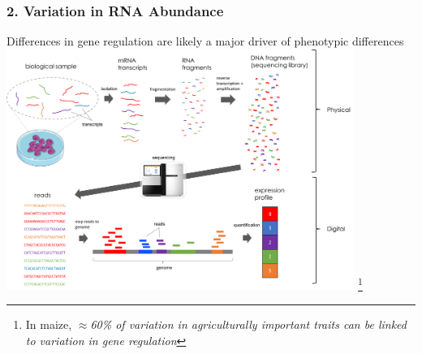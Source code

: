 \documentclass{beamer}
\newcommand\blfootnote[1]{%
	\begingroup
	\renewcommand\thefootnote{}\footnote{#1}%
	\addtocounter{footnote}{-1}%
	\endgroup
}
\begin{document}
	
\begin{frame}
		\frametitle{2. Variation in RNA Abundance}
\scriptsize
Differences in gene regulation are likely a major driver of phenotypic differences\\

\centering	\includegraphics[keepaspectratio, width  = 0.85\textwidth]{img/rna_seq}
\blfootnote{ In maize, \textit{$\approx$60\% of variation in agriculturally important traits can be linked to variation in gene regulation}}
\end{frame}
	
\end{document}
